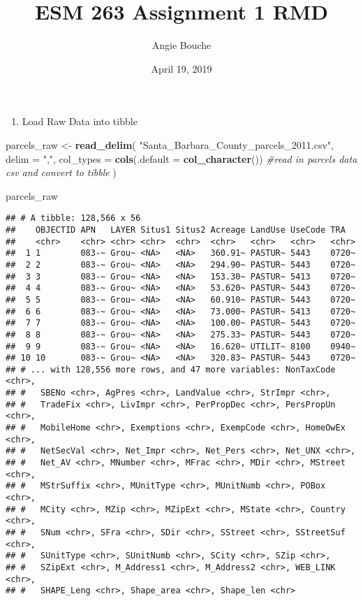 \documentclass[]{article}
\title{ESM 263 Assignment 1 RMD}
\author{Angie Bouche}
\date{April 19, 2019}
\newenvironment{Shaded}{\begin{snugshade}}{\end{snugshade}}
\newcommand{\KeywordTok}[1]{\textcolor[rgb]{0.13,0.29,0.53}{\textbf{#1}}}
\newcommand{\DataTypeTok}[1]{\textcolor[rgb]{0.13,0.29,0.53}{#1}}
\newcommand{\StringTok}[1]{\textcolor[rgb]{0.31,0.60,0.02}{#1}}
\newcommand{\CommentTok}[1]{\textcolor[rgb]{0.56,0.35,0.01}{\textit{#1}}}
\newcommand{\NormalTok}[1]{#1}
\providecommand{\tightlist}{%
  \setlength{\itemsep}{0pt}\setlength{\parskip}{0pt}}
\begin{document}
\maketitle

\begin{enumerate}
\def\labelenumi{\arabic{enumi}.}
\tightlist
\item
  Load Raw Data into tibble
\end{enumerate}

\begin{Shaded}
\begin{Highlighting}[]
\NormalTok{parcels_raw <-}\StringTok{   }\KeywordTok{read_delim}\NormalTok{(}
    \StringTok{"Santa_Barbara_County_parcels_2011.csv"}\NormalTok{,}
    \DataTypeTok{delim =} \StringTok{","}\NormalTok{,}
    \DataTypeTok{col_types =} \KeywordTok{cols}\NormalTok{(}\DataTypeTok{.default =} \KeywordTok{col_character}\NormalTok{()) }\CommentTok{#read in parcels data csv and convert to tibble}
\NormalTok{  )}

\NormalTok{parcels_raw}
\end{Highlighting}
\end{Shaded}

\begin{verbatim}
## # A tibble: 128,566 x 56
##    OBJECTID APN   LAYER Situs1 Situs2 Acreage LandUse UseCode TRA  
##    <chr>    <chr> <chr> <chr>  <chr>  <chr>   <chr>   <chr>   <chr>
##  1 1        083-~ Grou~ <NA>   <NA>   360.91~ PASTUR~ 5443    0720~
##  2 2        083-~ Grou~ <NA>   <NA>   294.90~ PASTUR~ 5443    0720~
##  3 3        083-~ Grou~ <NA>   <NA>   153.30~ PASTUR~ 5413    0720~
##  4 4        083-~ Grou~ <NA>   <NA>   53.620~ PASTUR~ 5443    0720~
##  5 5        083-~ Grou~ <NA>   <NA>   60.910~ PASTUR~ 5443    0720~
##  6 6        083-~ Grou~ <NA>   <NA>   73.000~ PASTUR~ 5413    0720~
##  7 7        083-~ Grou~ <NA>   <NA>   100.00~ PASTUR~ 5443    0720~
##  8 8        083-~ Grou~ <NA>   <NA>   275.33~ PASTUR~ 5443    0720~
##  9 9        083-~ Grou~ <NA>   <NA>   16.620~ UTILIT~ 8100    0940~
## 10 10       083-~ Grou~ <NA>   <NA>   320.83~ PASTUR~ 5443    0720~
## # ... with 128,556 more rows, and 47 more variables: NonTaxCode <chr>,
## #   SBENo <chr>, AgPres <chr>, LandValue <chr>, StrImpr <chr>,
## #   TradeFix <chr>, LivImpr <chr>, PerPropDec <chr>, PersPropUn <chr>,
## #   MobileHome <chr>, Exemptions <chr>, ExempCode <chr>, HomeOwEx <chr>,
## #   NetSecVal <chr>, Net_Impr <chr>, Net_Pers <chr>, Net_UNX <chr>,
## #   Net_AV <chr>, MNumber <chr>, MFrac <chr>, MDir <chr>, MStreet <chr>,
## #   MStrSuffix <chr>, MUnitType <chr>, MUnitNumb <chr>, POBox <chr>,
## #   MCity <chr>, MZip <chr>, MZipExt <chr>, MState <chr>, Country <chr>,
## #   SNum <chr>, SFra <chr>, SDir <chr>, SStreet <chr>, SStreetSuf <chr>,
## #   SUnitType <chr>, SUnitNumb <chr>, SCity <chr>, SZip <chr>,
## #   SZipExt <chr>, M_Address1 <chr>, M_Address2 <chr>, WEB_LINK <chr>,
## #   SHAPE_Leng <chr>, Shape_area <chr>, Shape_len <chr>
\end{verbatim}
\end{document}
